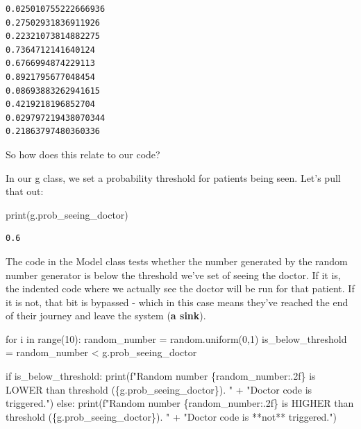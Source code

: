 \documentclass[
  letterpaper,
  DIV=11,
  numbers=noendperiod]{scrreprt}
\newenvironment{Shaded}{\begin{snugshade}}{\end{snugshade}}
\newcommand{\BuiltInTok}[1]{\textcolor[rgb]{0.00,0.23,0.31}{#1}}
\newcommand{\ControlFlowTok}[1]{\textcolor[rgb]{0.00,0.23,0.31}{#1}}
\newcommand{\DecValTok}[1]{\textcolor[rgb]{0.68,0.00,0.00}{#1}}
\newcommand{\KeywordTok}[1]{\textcolor[rgb]{0.00,0.23,0.31}{#1}}
\newcommand{\NormalTok}[1]{\textcolor[rgb]{0.00,0.23,0.31}{#1}}
\newcommand{\OperatorTok}[1]{\textcolor[rgb]{0.37,0.37,0.37}{#1}}
\newcommand{\SpecialCharTok}[1]{\textcolor[rgb]{0.37,0.37,0.37}{#1}}
\newcommand{\SpecialStringTok}[1]{\textcolor[rgb]{0.13,0.47,0.30}{#1}}
\newcommand{\StringTok}[1]{\textcolor[rgb]{0.13,0.47,0.30}{#1}}
\begin{document}
\begin{verbatim}
0.025010755222666936
0.27502931836911926
0.22321073814882275
0.7364712141640124
0.6766994874229113
0.8921795677048454
0.08693883262941615
0.4219218196852704
0.029797219438070344
0.21863797480360336
\end{verbatim}

So how does this relate to our code?

In our g class, we set a probability threshold for patients being seen.
Let's pull that out:

\begin{Shaded}
\begin{Highlighting}[]
\BuiltInTok{print}\NormalTok{(g.prob\_seeing\_doctor)}
\end{Highlighting}
\end{Shaded}

\begin{verbatim}
0.6
\end{verbatim}

The code in the Model class tests whether the number generated by the
random number generator is below the threshold we've set of seeing the
doctor. If it is, the indented code where we actually see the doctor
will be run for that patient. If it is not, that bit is bypassed - which
in this case means they've reached the end of their journey and leave
the system (\textbf{a sink}).

\begin{Shaded}
\begin{Highlighting}[]
\ControlFlowTok{for}\NormalTok{ i }\KeywordTok{in} \BuiltInTok{range}\NormalTok{(}\DecValTok{10}\NormalTok{):}
\NormalTok{  random\_number }\OperatorTok{=}\NormalTok{ random.uniform(}\DecValTok{0}\NormalTok{,}\DecValTok{1}\NormalTok{)}
\NormalTok{  is\_below\_threshold }\OperatorTok{=}\NormalTok{ random\_number }\OperatorTok{\textless{}}\NormalTok{ g.prob\_seeing\_doctor}

  \ControlFlowTok{if}\NormalTok{ is\_below\_threshold:}
    \BuiltInTok{print}\NormalTok{(}\SpecialStringTok{f"Random number }\SpecialCharTok{\{}\NormalTok{random\_number}\SpecialCharTok{:.2f\}}\SpecialStringTok{ is LOWER than threshold (}\SpecialCharTok{\{}\NormalTok{g}\SpecialCharTok{.}\NormalTok{prob\_seeing\_doctor}\SpecialCharTok{\}}\SpecialStringTok{). "} \OperatorTok{+}
    \StringTok{"Doctor code is triggered."}\NormalTok{)}
  \ControlFlowTok{else}\NormalTok{:}
    \BuiltInTok{print}\NormalTok{(}\SpecialStringTok{f"Random number }\SpecialCharTok{\{}\NormalTok{random\_number}\SpecialCharTok{:.2f\}}\SpecialStringTok{ is HIGHER than threshold (}\SpecialCharTok{\{}\NormalTok{g}\SpecialCharTok{.}\NormalTok{prob\_seeing\_doctor}\SpecialCharTok{\}}\SpecialStringTok{). "} \OperatorTok{+}
    \StringTok{"Doctor code is **not** triggered."}\NormalTok{)}
\end{Highlighting}
\end{Shaded}
\end{document}

